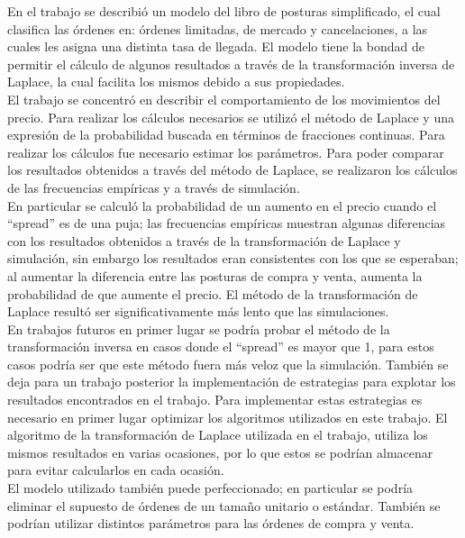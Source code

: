 \documentclass[11pt]{article}
\numberwithin{equation}{section} %
\begin{document}
En el trabajo se describió un modelo del libro de posturas simplificado, el cual clasifica las órdenes en: órdenes limitadas, de mercado y cancelaciones, a las cuales les asigna una distinta tasa de llegada. El modelo tiene la bondad de permitir el cálculo de algunos resultados a través de la transformación inversa de Laplace, la cual facilita los mismos debido a sus propiedades.\\

El trabajo se concentró en describir el comportamiento de los movimientos del precio. Para realizar los cálculos necesarios se utilizó el método de Laplace y una expresión de la probabilidad buscada en términos de fracciones continuas. Para realizar los cálculos fue necesario estimar los parámetros. Para poder comparar los resultados obtenidos a través del método de Laplace, se realizaron los cálculos de las frecuencias empíricas y a través de simulación.\\

En particular se calculó la probabilidad de un aumento en el precio cuando el ``spread'' es de una puja; las frecuencias empíricas muestran algunas diferencias con los resultados obtenidos a través de la transformación de Laplace y simulación, sin embargo los resultados eran consistentes con los que se esperaban; al aumentar la diferencia entre las posturas de compra y venta, aumenta la probabilidad de que aumente el precio. El método de la transformación de Laplace resultó ser significativamente más lento que las simulaciones.\\

En trabajos futuros en primer lugar se podría probar el método de la transformación inversa en casos donde el ``spread'' es mayor que 1, para estos casos podría ser que este método fuera más veloz que la simulación. También se deja para un trabajo posterior la implementación de estrategias para explotar los resultados encontrados en el trabajo. Para implementar estas estrategias es necesario en primer lugar optimizar los algoritmos utilizados en este trabajo. El algoritmo de la transformación de Laplace utilizada en el trabajo, utiliza los mismos resultados en varias ocasiones, por lo que estos se podrían almacenar para evitar calcularlos en cada ocasión.\\

El modelo utilizado también puede perfeccionado; en particular se podría eliminar el supuesto de órdenes de un tamaño unitario o estándar. También se podrían utilizar distintos parámetros para las órdenes de compra y venta.


\clearpage

\listoftables
\clearpage

\listoffigures
\clearpage

\nocite{*}



\end{document}
